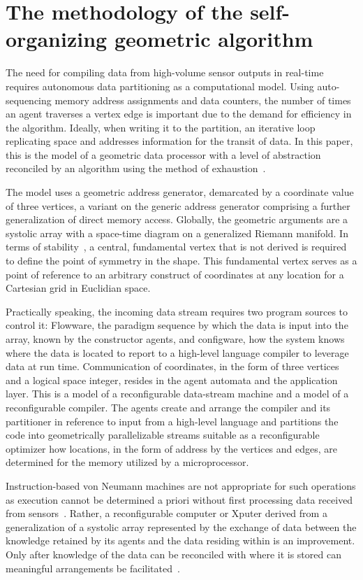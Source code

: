 \documentclass[11pt]{article}
\begin{document}
\section{The methodology of the self-organizing geometric algorithm}

The need for compiling data from high-volume sensor outputs in real-time requires autonomous data partitioning as a computational model. Using auto-sequencing memory address assignments and data counters, the number of times an agent traverses a vertex edge is important due to the demand for efficiency in the algorithm. Ideally, when writing it to the partition, an iterative loop replicating space and addresses information for the transit of data. In this paper, this is the model of a geometric data processor with a level of abstraction reconciled by an algorithm using the method of exhaustion~\cite{ruffa2002,knuth1969}.

The model uses a geometric address generator, demarcated by a coordinate value of three vertices, a variant on the generic address generator comprising a further generalization of direct memory access. Globally, the geometric arguments are a systolic array with a space-time diagram on a generalized Riemann manifold. In terms of stability~\cite{dorst2002}, a central, fundamental vertex that is not derived is required to define the point of symmetry in the shape. This fundamental vertex serves as a point of reference to an arbitrary construct of coordinates at any location for a Cartesian grid in Euclidian space.

Practically speaking, the incoming data stream requires two program sources to control it: Flowware, the paradigm sequence by which the data is input into the array, known by the constructor agents, and configware, how the system knows where the data is located to report to a high-level language compiler to leverage data at run time. Communication of coordinates, in the form of three vertices and a logical space integer, resides in the agent automata and the application layer. This is a model of a reconfigurable data-stream machine and a model of a reconfigurable compiler. The agents create and arrange the compiler and its partitioner in reference to input from a high-level language and partitions the code into geometrically parallelizable streams suitable as a reconfigurable optimizer how locations, in the form of address by the vertices and edges, are determined for the memory utilized by a microprocessor.

Instruction-based von Neumann machines are not appropriate for such operations as execution cannot be determined a priori without first processing data received from sensors~\cite{vonneumann1966}. Rather, a reconfigurable computer or Xputer derived from a generalization of a systolic array represented by the exchange of data between the knowledge retained by its agents and the data residing within is an improvement. Only after knowledge of the data can be reconciled with where it is stored can meaningful arrangements be facilitated~\cite{hartenstein2008}.
\end{document}
